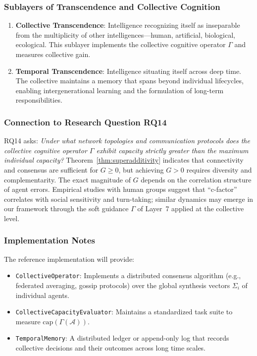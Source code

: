 \subsubsection{Sublayers of Transcendence and Collective Cognition}
\begin{enumerate}
    \item \textbf{Collective Transcendence}: Intelligence recognizing itself as inseparable from the multiplicity of other intelligences—human, artificial, biological, ecological. This sublayer implements the collective cognitive operator $\Gamma$ and measures collective gain.
    \item \textbf{Temporal Transcendence}: Intelligence situating itself across deep time. The collective maintains a memory that spans beyond individual lifecycles, enabling intergenerational learning and the formulation of long-term responsibilities.
\end{enumerate}

\subsubsection{Connection to Research Question RQ14}
RQ14 asks: \emph{Under what network topologies and communication protocols does the collective cognitive operator $\Gamma$ exhibit capacity strictly greater than the maximum individual capacity?} Theorem~\ref{thm:superadditivity} indicates that connectivity and consensus are sufficient for $G \ge 0$, but achieving $G > 0$ requires diversity and complementarity. The exact magnitude of $G$ depends on the correlation structure of agent errors. Empirical studies with human groups \cite{woolley2010} suggest that ``c-factor'' correlates with social sensitivity and turn-taking; similar dynamics may emerge in our framework through the soft guidance $\Gamma$ of Layer~7 applied at the collective level.

\subsubsection{Implementation Notes}
The reference implementation will provide:
\begin{itemize}
    \item \texttt{CollectiveOperator}: Implements a distributed consensus algorithm (e.g., federated averaging, gossip protocols) over the global synthesis vectors $\Sigma_i$ of individual agents.
    \item \texttt{CollectiveCapacityEvaluator}: Maintains a standardized task suite to measure $\text{cap}(\Gamma(\mathcal{A}))$.
    \item \texttt{TemporalMemory}: A distributed ledger or append-only log that records collective decisions and their outcomes across long time scales.
\end{itemize}

